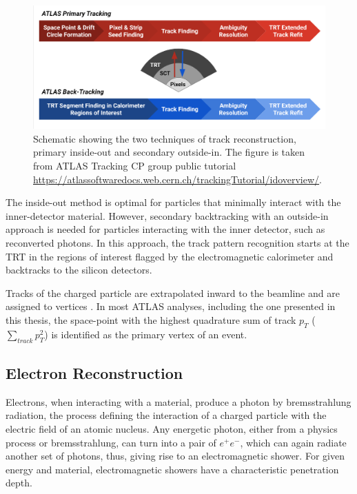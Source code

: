\begin{figure}[!htb]
    \centering
    \includegraphics[width=.9\linewidth]{figures/LHC/trackingflowchart.png}
    \caption{Schematic showing the two techniques of track reconstruction, primary inside-out and secondary outside-in. The figure is taken from ATLAS Tracking CP group public tutorial \url{https://atlassoftwaredocs.web.cern.ch/trackingTutorial/idoverview/}. \label{fig:TrackingOutline}}
\end{figure}

The inside-out method is optimal for particles that minimally interact with the inner-detector material. However, secondary backtracking with an outside-in approach is needed for particles interacting with the inner detector, such as reconverted photons. In this approach, the track pattern recognition starts at the TRT in the regions of interest flagged by the electromagnetic calorimeter and backtracks to the silicon detectors. 

Tracks of the charged particle are extrapolated inward to the beamline and are assigned to vertices \cite{VertexReconstruction}. In most ATLAS analyses, including the one presented in this thesis, the space-point with the highest quadrature sum of track $p_T$ ($\sum_{track}{p_{T}^2}$) is identified as the primary vertex of an event.

\subsection{Electron Reconstruction}
\label{subsec:ParticleRecon_Elec}
Electrons, when interacting with a material, produce a photon by bremsstrahlung radiation, the process defining the interaction of a charged particle with the electric field of an atomic nucleus. Any energetic photon, either from a physics process or bremsstrahlung, can turn into a pair of $e^{+}e^{-}$, which can again radiate another set of photons, thus, giving rise to an electromagnetic shower. For given energy and material, electromagnetic showers have a characteristic penetration depth.

